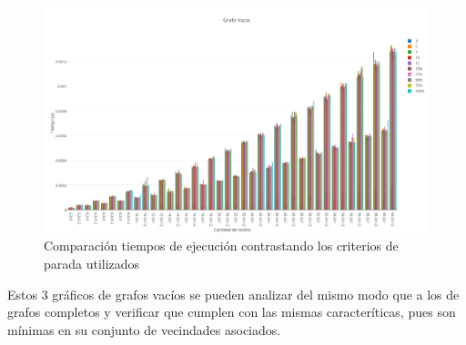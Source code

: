   \begin{figure}[h!]
   \begin{center}
 	\includegraphics[scale=0.35]{imagenes/grasp/vacio-5vs10.png}
 	\caption{Comparaci\'on tiempos de ejecuci\'on contrastando los criterios de parada utilizados}
   \end{center}
 \end{figure}
\newpage
Estos 3 gr\'aficos de grafos vac\'ios se pueden analizar del mismo modo que a los de grafos completos y verificar que cumplen con las mismas caracter\'iticas, pues son m\'inimas en su conjunto de vecindades asociados.

